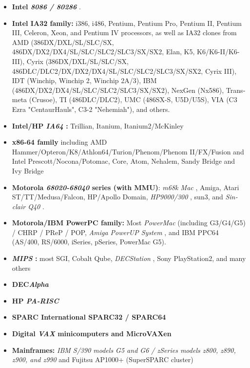 \begin{latin}
\begin{itemize}
	\item {\bfseries Intel \emph{8086 / 80286} }.
	\item {\bfseries Intel IA32 family:} i386, i486, Pentium, Pentium Pro, 
		Pentium II, Pentium III, Celeron, Xeon, and Pentium IV processors, 
		as well as IA32 clones from AMD (386DX/DXL/SL/SLC/SX, 
		486DX/DX2/DX4/SL/SLC/SLC2/SLC3/SX/SX2, Elan, K5, 
		K6/K6-II/K6-III), Cyrix (386DX/DXL/SL/SLC/SX, 
		486DLC/DLC2/DX/DX2/DX4/SL/SLC/SLC2/SLC3/SX/SX2, Cyrix III), 
		IDT (Winchip, Winchip 2, Winchip 2A/3), 
		IBM (486DX/DX2/DX4/SL/SLC/SLC2/SLC3/SX/SX2),
		NexGen (Nx586), Transmeta (Crusoe), 
		TI (486DLC/DLC2), UMC (486SX-S, U5D/U5S), 
		VIA (C3 Ezra "CentaurHauls", C3-2 "Nehemiah"), 
		and others.
	\item {\bfseries Intel/HP \emph{IA64} :} Trillian, Itanium, Itanium2/McKinley
	\item {\bfseries x86-64 family} including AMD Hammer/Opteron/K8/Athlon64/Turion/Phenom/Phenom II/FX/Fusion and 
		Intel Prescott/Nocona/Potomac, Core, Atom, Nehalem, Sandy Bridge and Ivy Bridge
	\item {\bfseries Motorola \emph{68020-68040}
		 series (with MMU)}: 
		\emph{m68k Mac} ,
		Amiga, Atari ST/TT/Medusa/Falcon, HP/Apollo Domain,
		\emph{HP9000/300} , sun3, and 
		\emph{Sinclair Q40} .
	\item {\bfseries Motorola/IBM PowerPC family:} Most 
		\emph{PowerMac} 
		 (including G3/G4/G5)  / CHRP / PReP / POP, \emph{Amiga PowerUP System}
		 , and IBM PPC64 (AS/400, RS/6000, iSeries,	pSeries, PowerMac G5).
	\item {\bfseries \emph{MIPS} :} most SGI, Cobalt Qube, 
		\emph{DECStation} , Sony PlayStation2, and many others
	\item {\bfseries DEC\emph{Alpha} }
	\item {\bfseries HP \emph{PA-RISC} }
	\item {\bfseries SPARC International SPARC32 / SPARC64}
	\item {\bfseries Digital \emph{VAX}  minicomputers and MicroVAXen}
	\item {\bfseries Mainframes:} 
	\emph{IBM S/390 models G5 and G6 / zSeries models z800, z890, z900, and z990} 
		 and Fujitsu AP1000+ (SuperSPARC cluster)
\end{itemize}
\end{latin}

